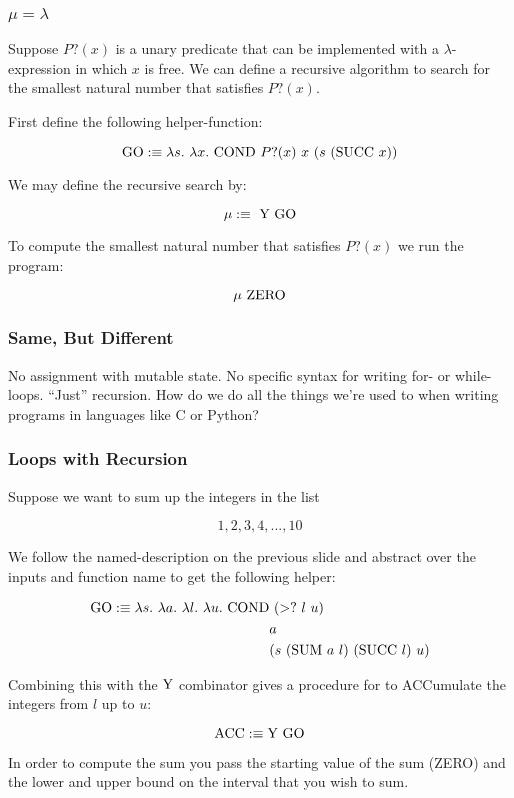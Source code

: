 \documentclass{beamer}
\begin{document}
\begin{frame}
	\frametitle{$\mu = \lambda$}

	Suppose $P?(x)$ is a unary predicate that can be implemented with a $\lambda$-expression in which $x$ is free. We can define a recursive algorithm to search for the smallest natural number that satisfies $P?(x)$. 

	First define the following helper-function:

	$$\GO :\equiv \lambda s. \ \lambda x. \ \COND \ P?(x) \ x \ (s \ (\SUCC \ x))$$

	We may define the recursive search by: 

	$$\mu :\equiv \ \text{Y} \ \text{GO}$$ 

	To compute the smallest natural number that satisfies $P?(x)$ we run the program: 

	$$\mu \ \text{ZERO}$$

\end{frame}

\begin{frame}
	\frametitle{Same, But Different}

	No assignment with mutable state. No specific syntax for writing for- or while-loops. ``Just'' recursion. How do we do all the things we're used to when writing programs in languages like C or Python? 

	\vspace{5cm}
	
\end{frame}

\begin{frame}
	\frametitle{Loops with Recursion}

	Suppose we want to sum up the integers in the list 

	$$1, 2, 3, 4, ..., 10$$

	We follow the named-description on the previous slide and abstract over the inputs and function name to get the following helper: 

	\begin{align*}
		\GO :\equiv \lambda s. \ \lambda a. \ \lambda l. \ \lambda u. \ \COND & \ (>? \ l \ u) \\
		& a \\ 
		&(s \ (\SUM \ a \ l) \ (\SUCC \ l) \ u)
	\end{align*}

	Combining this with the $\text{Y}$ combinator gives a procedure for to ACCumulate the integers from $l$ up to $u$: 

	$$\text{ACC} :\equiv \text{Y} \ \text{GO}$$

	In order to compute the sum you pass the starting value of the sum (ZERO) and the lower and upper bound on the interval that you wish to sum.

\end{frame}
\end{document}
